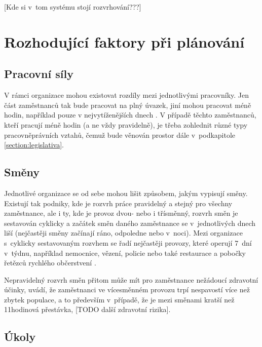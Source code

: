 \documentclass[twoside]{ctuthesis}
\begin{document}
[Kde si v~tom systému stojí rozvrhování???]



\section{Rozhodující faktory při plánování}

\subsection{Pracovní síly}
V rámci organizace mohou existovat rozdíly mezi jednotlivými pracovníky. Jen část zaměstnanců tak bude pracovat na plný úvazek, jiní mohou pracovat méně hodin, například pouze v nejvytíženějších dnech \cite{lin2015}. V případě těchto zaměstnanců, kteří pracují méně hodin (a ne vždy pravidelně), je třeba zohlednit různé typy pracovněprávních vztahů, čemuž bude věnován prostor dále v~podkapitole \ref{section:legislativa}.

\subsection{Směny}
\label{sub:smeny}
Jednotlivé organizace se od sebe mohou lišit způsobem, jakým vypisují směny. Existují tak podniky, kde je rozvrh práce pravidelný a stejný pro všechny zaměstnance, ale i ty, kde je provoz dvou- nebo i třísměnný, rozvrh směn je sestavován cyklicky a začátek směn daného zaměstnance se v~jednotlivých dnech liší (nejčastěji směny začínají ráno, odpoledne nebo v~noci). Mezi organizace s~cyklicky sestavovaným rozvhem se řadí nejčastěji provozy, které operují 7~dní v~týdnu, například nemocnice, vězení, policie nebo také restaurace a pobočky řetězců rychlého občerstvení \cite{bechtold1981work}.

Nepravidelný rozvrh směn přitom může mít pro zaměstnance nežádoucí zdravotní účinky, \cite{flo2013shift} uvádí, že zaměstnanci ve vícesměnném provozu trpí nespavostí více než zbytek populace, a to především v~případě, že je mezi směnami kratší než 11hodinová přestávka, [TODO další zdravotní rizika].

\subsection{Úkoly}
\end{document}
